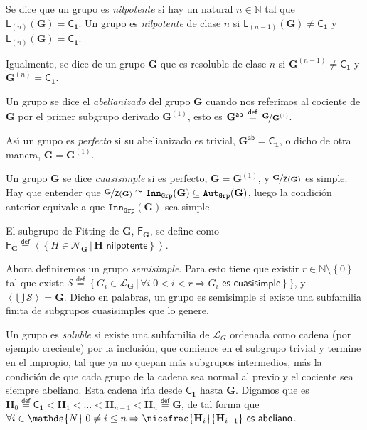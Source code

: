 \documentclass[final,12pt,a4paper,twoside,fleqn]{extbook}
\newcommand{\entreparentesis}[1]{\ensuremath{
        \left({#1}\right)
}}
\newcommand{\entreangulos}[1]{\ensuremath{\left\langle{#1}\right\rangle}}
\newcommand{\mathdef}{\ensuremath{\stackrel{\mathsf{def}}{{}={}}}}
\newcommand{\set}[1]{\ensuremath{\left\lbrace{#1}\right\rbrace}}
\newcommand{\extset}[2]{\ensuremath{
        \left\lbrace{#1}\,\vert\,{#2}\right\rbrace
}}
\newcommand{\setN}{\ensuremath{\mathds{N}}}
\newcommand{\generadoporUitem}[1]{\ensuremath{
        \entreangulos{#1}
}}
\newcommand{\generadopor}[1]{\ensuremath{
        \generadoporUitem{#1}
}}
\newcommand{\grG}{\ensuremath{\mathbf{G}}}
\newcommand{\grH}{\ensuremath{\mathbf{H}}}
\newcommand{\subgr}{\ensuremath{<}}
\newcommand{\graut}[1]{\ensuremath{{\mathtt{Aut}}_{\mathtt{Grp}}{\left({#1}\right)}}}
\newcommand{\grinn}[1]{\ensuremath{{\mathtt{Inn}}_{\mathtt{Grp}}{\left({#1}\right)}}}
\newcommand{\grlattice}[1]{\ensuremath{
        {\mathcal{L}}_{#1}
}}
\newcommand{\grcoc}[2]{\ensuremath{
        \nicefrac{#1}{#2}
}}
\newcommand{\normgrlattice}[1]{\ensuremath{{\mathcal{N}}_{#1}}}
\newcommand{\grclass}[1]{\ensuremath{\mathsf{#1}}}
\newcommand{\trivialgr}{\ensuremath{{\grclass{C}}_{\mathbf{1}}}}
\newcommand{\centro}[1]{\ensuremath{
        {\mathsf{Z}}
        {\left({#1}\right)}
}}
\newcommand{\fitting}[1]{\ensuremath{{\bm{\mathsf{F}}}_{#1}}}
\newcommand{\grderivado}[2]{\ensuremath{
        {#1}^{\entreparentesis{#2}}
}}
\newcommand{\grLderivado}[2]{\ensuremath{
        {{\mathsf{L}}_{\entreparentesis{#2}}}
        {\entreparentesis{#1}}
}}
\newcommand{\grabelianizado}[1]{\ensuremath{
        {#1}^{\mathsf{ab}}
}}
\theoremstyle{definition}
\theoremstyle{remark}
\begin{document}
Se dice que un grupo es \emph{nilpotente} si hay un natural $n          \in \setN$ tal que
$\grLderivado{\grG}{n}=\trivialgr$. Un grupo es \emph{nilpotente} de clase $n$ si
$\grLderivado{\grG}{n-1}          \neq          \trivialgr$ y $\grLderivado{\grG}{n}=\trivialgr$.

Igualmente, se dice de un grupo $\grG$ que es resoluble de clase $n$ si
$\grderivado{\grG}{n-1}         \neq         \trivialgr$ y $\grderivado{\grG}{n}=\trivialgr$.

Un grupo se dice el \emph{abelianizado} del grupo $\grG$ cuando nos referimos al cociente
de $\grG$ por el primer subgrupo derivado $\grderivado{\grG}{1}$, esto es
$\grabelianizado{\grG}\mathdef \grcoc{\grG}{\grderivado{\grG}{1}}$.

As{\'{\i}} un grupo es \emph{perfecto} si su abelianizado es trivial,
$\grabelianizado{\grG} = \trivialgr$, o dicho de otra manera,
$\grG = \grderivado{\grG}{1}$.

Un grupo $\grG$ se dice \emph{cuasisimple} si es perfecto, $\grG = \grderivado{\grG}{1}$, y
$\grcoc{\grG}{\centro{\grG}}$ es simple. Hay que entender que
$\grcoc{\grG}{\centro{\grG}}          \cong          \grinn{\grG}          \subseteq \graut{\grG}$,
luego la condici\'on
anterior equivale a que $\grinn{\grG}$ sea simple.

El subgrupo de Fitting de $\grG$, $\fitting{\grG}$, se define como
$\fitting{\grG}
\mathdef
\generadopor{
    \extset{H         \in \normgrlattice{\grG}}
    {\grH \textsf{ nilpotente}}
}
$.

Ahora definiremos un grupo \emph{semisimple}. Para esto tiene que existir
$r          \in \setN\setminus\set{0}$ tal que existe
$\mathcal{S} \mathdef \extset{G_i       \in \grlattice{\grG}}
{\forall i\; 0<i<r       \Rightarrow          G_i \textsf{ es cuasisimple}}\rbrace$,
y $\generadopor{\bigcup\mathcal{S}}=\grG$. Dicho en palabras, un grupo es semisimple si existe
una subfamilia finita de subgrupos cuasisimples que lo genere.

Un grupo es \emph{soluble} si existe una subfamilia de $\grlattice{G}$ ordenada
como cadena (por ejemplo creciente) por la inclusi\'on, que comience en el
subgrupo trivial y termine en el impropio, tal que ya no quepan m\'as
subgrupos intermedios, m\'as la condici\'on de que cada grupo de la cadena sea
normal al previo y el cociente sea siempre abeliano.
Esta cadena ir{\'{\i}}a desde
$\trivialgr$ hasta $\grG$. Digamos que es
$\grH_0 \mathdef \trivialgr \subgr \grH_1 \subgr \ldots
\subgr \grH_{n-1} \subgr \grH_n \mathdef \grG$, de tal forma que
$\forall i             \in \setN\;0             \neq             i\leq n             \Rightarrow
\grcoc{\grH_i}{\grH_{i-1}} \textsf{ es abeliano}$.
\end{document}
